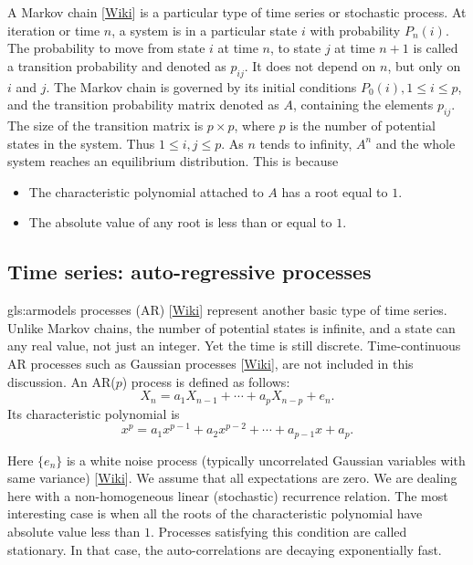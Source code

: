 \documentclass[oneside,10pt]{book}
\begin{document}
A \textcolor{index}{Markov chain} [\href{https://en.wikipedia.org/wiki/Markov_chain}{Wiki}] is a particular type of  time series or stochastic process. At iteration or time $n$, a system is in a particular state $i$ with probability $P_n(i)$. The probability to move from state $i$ at time $n$, to state $j$ at time $n + 1$ is called a transition probability and denoted as $p_{ij}$. It does not depend on $n$, but only on $i$ and $j$. The Markov chain is governed by its initial conditions $P_0(i), 1\leq i\leq p$, and the transition probability matrix denoted as $A$, containing the elements $p_{ij}$. The size of the transition matrix is
$p \times p$, where $p$ is the number of potential states in the system. Thus $1\leq i,j\leq p$. As $n$ tends to infinity, $A^n$ and the whole system reaches an equilibrium distribution. This is because

\begin{itemize}
\item	The \textcolor{index}{characteristic polynomial} attached to $A$ has a root equal to $1$.
\item	The absolute value of any root is less than or equal to $1$.
\end{itemize}

\subsection{Time series: auto-regressive processes}\label{tslineas}

\Gls{gls:armodels} processes (AR) [\href{https://en.wikipedia.org/wiki/Autoregressive_model}{Wiki}] represent another basic type of time series. Unlike Markov chains, the number of potential states is infinite, and a state can any real value, not just an integer. Yet the time is still discrete. Time-continuous AR processes such as \textcolor{index}{Gaussian processes} [\href{https://en.wikipedia.org/wiki/Gaussian_process}{Wiki}], are not included in this discussion. An AR($p$) process is defined as follows:
$$
X_n=a_1 X_{n-1}+ \cdots+ a_p X_{n-p} + e_n.
$$
Its \textcolor{index}{characteristic polynomial} is
\begin{equation}\label{rootcp}
x^p=a_1 x^{p-1}+a_2 x^{p-2}+\cdots + a_{p-1}x +a_p.
\end{equation}

\noindent Here $\{ e_n \}$ is a \textcolor{index}{white noise} process (typically uncorrelated Gaussian variables with same variance) [\href{https://en.wikipedia.org/wiki/White_noise}{Wiki}]. We assume that all expectations are zero. We are dealing here with a non-homogeneous linear (stochastic) recurrence relation. The most interesting case is when all the roots of the characteristic polynomial have absolute value less than $1$. Processes satisfying this condition are called
\textcolor{index}{stationary}. In that case, the \textcolor{index}{auto-correlations} are decaying exponentially fast.
\end{document}
